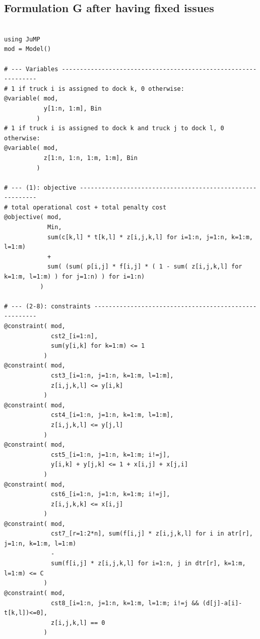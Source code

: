 \documentclass[preprint,12pt,authoryear]{elsarticle}
\begin{document}
%
%
\subsection{Formulation G after having fixed issues}
\label{app:JuMPformulationG}

{\scriptsize
\begin{verbatim}

using JuMP
mod = Model()

# --- Variables ---------------------------------------------------------------
# 1 if truck i is assigned to dock k, 0 otherwise: 
@variable( mod, 
           y[1:n, 1:m], Bin
         )
# 1 if truck i is assigned to dock k and truck j to dock l, 0 otherwise:
@variable( mod, 
           z[1:n, 1:n, 1:m, 1:m], Bin
         )

# --- (1): objective ----------------------------------------------------------
# total operational cost + total penalty cost
@objective( mod, 
            Min, 
            sum(c[k,l] * t[k,l] * z[i,j,k,l] for i=1:n, j=1:n, k=1:m, l=1:m)
            +
            sum( (sum( p[i,j] * f[i,j] * ( 1 - sum( z[i,j,k,l] for k=1:m, l=1:m) ) for j=1:n) ) for i=1:n)
          )

# --- (2-8): constraints ------------------------------------------------------
@constraint( mod, 
             cst2_[i=1:n], 
             sum(y[i,k] for k=1:m) <= 1
           ) 
@constraint( mod, 
             cst3_[i=1:n, j=1:n, k=1:m, l=1:m], 
             z[i,j,k,l] <= y[i,k]
           )
@constraint( mod, 
             cst4_[i=1:n, j=1:n, k=1:m, l=1:m], 
             z[i,j,k,l] <= y[j,l]
           )
@constraint( mod, 
             cst5_[i=1:n, j=1:n, k=1:m; i!=j], 
             y[i,k] + y[j,k] <= 1 + x[i,j] + x[j,i]
           )
@constraint( mod, 
             cst6_[i=1:n, j=1:n, k=1:m; i!=j],
             z[i,j,k,k] <= x[i,j] 
           )
@constraint( mod, 
             cst7_[r=1:2*n], sum(f[i,j] * z[i,j,k,l] for i in atr[r], j=1:n, k=1:m, l=1:m)
             - 
             sum(f[i,j] * z[i,j,k,l] for i=1:n, j in dtr[r], k=1:m, l=1:m) <= C
           )
@constraint( mod, 
             cst8_[i=1:n, j=1:n, k=1:m, l=1:m; i!=j && (d[j]-a[i]-t[k,l])<=0],  
             z[i,j,k,l] == 0
           )
\end{verbatim}
}
\end{document}
